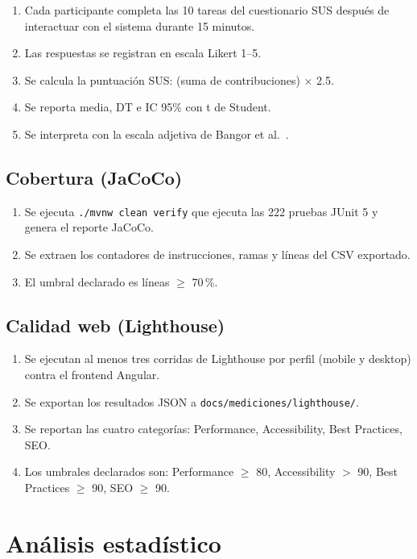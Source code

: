 \begin{enumerate}
  \item Cada participante completa las 10 tareas del cuestionario SUS \cite{brooke1996} después de interactuar con el sistema durante 15 minutos.
  \item Las respuestas se registran en escala Likert 1--5.
  \item Se calcula la puntuación SUS: (suma de contribuciones) $\times$ 2.5.
  \item Se reporta media, DT e IC 95\% con t de Student.
  \item Se interpreta con la escala adjetiva de Bangor et al.~\cite{bangor2009,bangor2008}.
\end{enumerate}

\subsection{Cobertura (JaCoCo)}

\begin{enumerate}
  \item Se ejecuta \texttt{./mvnw clean verify} que ejecuta las 222 pruebas JUnit 5 y genera el reporte JaCoCo.
  \item Se extraen los contadores de instrucciones, ramas y líneas del CSV exportado.
  \item El umbral declarado es líneas $\geq$ 70\,\%.
\end{enumerate}

\subsection{Calidad web (Lighthouse)}

\begin{enumerate}
  \item Se ejecutan al menos tres corridas de Lighthouse por perfil (mobile y desktop) contra el frontend Angular.
  \item Se exportan los resultados JSON a \texttt{docs/mediciones/lighthouse/}.
  \item Se reportan las cuatro categorías: Performance, Accessibility, Best Practices, SEO.
  \item Los umbrales declarados son: Performance $\geq$ 80, Accessibility $>$ 90, Best Practices $\geq$ 90, SEO $\geq$ 90.
\end{enumerate}

\section{Análisis estadístico}
\label{sec:estadistica}

